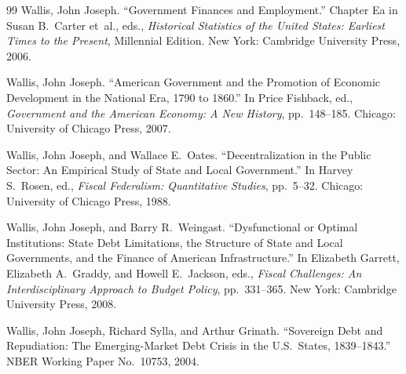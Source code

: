 \documentclass[12pt]{article}
\begin{document}
\begin{thebibliography}{99}
Wallis, John Joseph.
\newblock ``Government Finances and Employment.''
\newblock Chapter Ea in Susan B.\ Carter et~al., eds., \textit{Historical Statistics of the United States: Earliest Times to the Present}, Millennial Edition. New York: Cambridge University Press, 2006.

Wallis, John Joseph.
\newblock ``American Government and the Promotion of Economic Development in the National Era, 1790 to 1860.''
\newblock In Price Fishback, ed., \textit{Government and the American Economy: A New History}, pp.\ 148--185. Chicago: University of Chicago Press, 2007.

Wallis, John Joseph, and Wallace E.\ Oates.
\newblock ``Decentralization in the Public Sector: An Empirical Study of State and Local Government.''
\newblock In Harvey S.\ Rosen, ed., \textit{Fiscal Federalism: Quantitative Studies}, pp.\ 5--32. Chicago: University of Chicago Press, 1988.

Wallis, John Joseph, and Barry R.\ Weingast.
\newblock ``Dysfunctional or Optimal Institutions: State Debt Limitations, the Structure of State and Local Governments, and the Finance of American Infrastructure.''
\newblock In Elizabeth Garrett, Elizabeth A.\ Graddy, and Howell E.\ Jackson, eds., \textit{Fiscal Challenges: An Interdisciplinary Approach to Budget Policy}, pp.\ 331--365. New York: Cambridge University Press, 2008.

Wallis, John Joseph, Richard Sylla, and Arthur Grinath.
\newblock ``Sovereign Debt and Repudiation: The Emerging-Market Debt Crisis in the U.S.\ States, 1839--1843.''
\newblock NBER Working Paper No.\ 10753, 2004.

\end{thebibliography}
\end{document}
